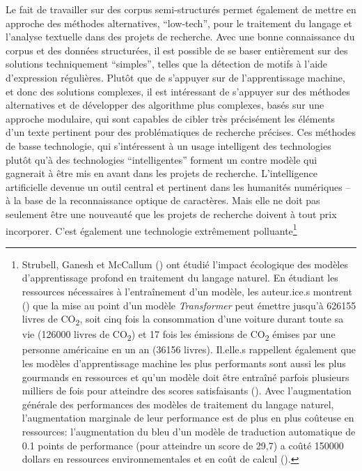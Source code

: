 Le fait de travailler sur des corpus semi-structurés permet également de mettre en approche des méthodes alternatives, \enquote{low-tech}, pour le traitement du langage et l'analyse textuelle dans des projets de recherche. Avec une bonne connaissance du corpus et des données structurées, il est possible de se baser entièrement sur des solutions techniquement \enquote{simples}, telles que la détection de motifs à l'aide d'\glspl{expression régulière}. Plutôt que de s'appuyer sur de l'apprentissage machine, et donc des solutions complexes, il est intéressant de s'appuyer sur des méthodes alternatives et de développer des algorithme plus complexes, basés sur une approche modulaire, qui sont capables de cibler très précisément les éléments d'un texte pertinent pour des problématiques de recherche précises. Ces méthodes de basse technologie, qui s'intéressent à un usage intelligent des technologies plutôt qu'à des technologies \enquote{intelligentes} forment un contre modèle qui gagnerait à être mis en avant dans les projets de recherche. L'intelligence artificielle devenue un outil central et pertinent dans les humanités numériques -- à la base de la reconnaissance optique de caractères. Mais elle ne doit pas seulement être une nouveauté que les projets de recherche doivent à tout prix incorporer. C'est également une technologie extrêmement polluante\footnote{
	Strubell, Ganesh et McCallum (\cite{strubell_energy_2019}) ont étudié l'impact écologique des modèles d'apprentissage profond en traitement du langage naturel. En étudiant les ressources nécessaires à l'entraînement d'un modèle, les auteur.ice.s montrent (\cite[p. 1]{strubell_energy_2019}) que la mise au point d'un modèle \textit{Transformer} peut émettre jusqu'à 626155 livres de CO\textsubscript{2}, soit cinq fois la consommation d'une voiture durant toute sa vie (126000 livres de CO\textsubscript{2}) et 17 fois les émissions de CO\textsubscript{2} émises par une personne américaine en un an (36156 livres). Il.elle.s rappellent également que les modèles d'apprentissage machine les plus performants sont aussi les plus gourmands en ressources et qu'un modèle doit être entraîné parfois plusieurs milliers de fois pour atteindre des scores satisfaisants (\cite[p. 1]{strubell_energy_2019}). Avec l'augmentation générale des performances des modèles de traitement du langage naturel, l'augmentation marginale de leur performance est de plus en plus coûteuse en ressources: l'augmentation du \gls{bleu} d'un modèle de traduction automatique de 0.1 points de performance (pour atteindre un score de 29,7) a coûté 150000 dollars en ressources environnementales et en coût de calcul (\cite[p. 4]{strubell_energy_2019}).
}
